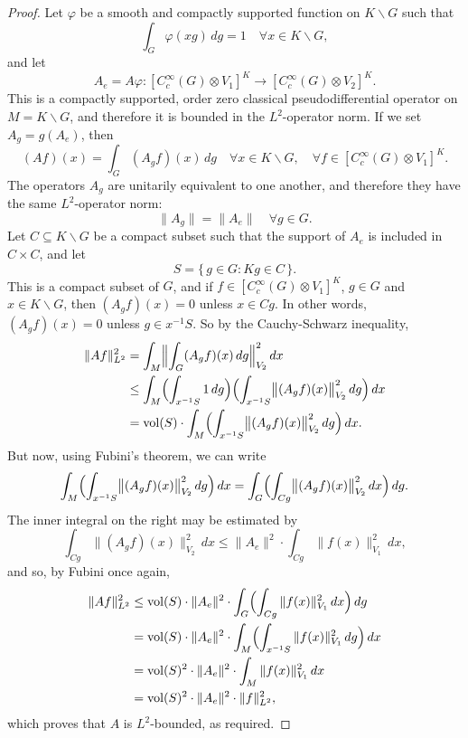 \documentclass[10pt,a4paper]{amsart}
\begin{document}
\begin{proof} 
Let $\varphi$ be a smooth and compactly supported function on $K \backslash G$ such that 
\[
\int_G  \varphi (xg) \, dg = 1 \quad \forall x\in K\backslash G,
\]
and let 
\[
A_e {=}  A\varphi  \colon [C_c^\infty ( G)\otimes V_1]^K \longrightarrow  [C_c^\infty ( G)\otimes V_2]^K .
\]
This is a compactly supported,  order zero classical pseudodifferential operator on $M{=}K\backslash G$, and therefore it is bounded in the $L^2$-operator norm. If we set $A_g = g(A_e)$, then 
\[
(A f)(x) = \int_G (A_g f)(x) \, dg \quad \forall x \in K \backslash G,\quad \forall f\in [C_c^\infty ( G)\otimes V_1]^K  .
\]
The operators $A_g$  are unitarily equivalent to one another, and therefore they have the same $L^2$-operator norm:
\[
\| A_g \| = \| A_e\| \quad  \forall g\in G.
\]
Let  $C\subseteq K \backslash G$ be a compact subset such that the  support of $A_e$ is included in 
$C{\times } C$, and let 
\[
S = \{ \, g\in G : Kg \in C\, \} .
\]
This is a compact subset of $G$, and if  $f\in[C_c^\infty ( G)\otimes V_1]^K $, $g\in G$ and $x\in K \backslash G$, then $(A_gf)(x) = 0$ unless $x\in Cg$. In other words, $(A_gf)(x) = 0$ unless $g\in x^{-1}S$. 
So by the Cauchy-Schwarz inequality,
\[
\begin{aligned}
\| A f\|_{L^2}^2 
    & = \int _M \Bigl \| \int_G (A_gf)(x)\, dg \Bigr\|_{V_2}^2 \, dx \\
    & \le \int _M \Bigl ( \int_{x^{-1} S} 1 \, dg\Bigr ) \Bigl (   \int_{x^{-1}S} \bigl \|(A_gf)(x)\bigr \|_{V_2} ^2 \, dg\Bigr )   \, dx \\
    & = \operatorname{vol}(S)\cdot   \int _M \Bigl (\int_{x^{-1}S} \bigl \|(A_gf)(x)\bigr \|_{V_2} ^2 \, dg \Bigr )   \, dx  .
\end{aligned}
\]
But now, using Fubini's theorem, we can write 
\[
\int _M \Bigl (\int_{x^{-1}S} \bigl \|(A_gf)(x)\bigr \|_{V_2} ^2 \, dg \Bigr )   \, dx \\
     = \int _G \Bigl (\int_{Cg}  \bigl \|(A_gf)(x)\bigr \|_{V_2} ^2 \, dx  \Bigr ) \, dg .
\]
The inner integral on the right may be estimated by
\[
\int_{Cg}  \bigl \|(A_gf)(x)\bigr \|_{V_2} ^2 \, dx \le \| A_e\|^2\cdot \int_{Cg}  \bigl \|f(x)\bigr \|_{V_1} ^2 \, dx ,
\]
and so,  by Fubini  once again,
\[
\begin{aligned}
\| A f\|_{L^2}^2  
    & \le  \operatorname{vol}(S)\cdot  \| A_e\|^2 \cdot 
    \int _G \Bigl (\int_{Cg}   \|f(x)  \|_{V_1} ^2 \, dx  \Bigr ) \, dg \\
    & = \operatorname{vol}(S)\cdot \| A_e\|^2  \cdot 
    \int _M \Bigl (\int_{x^{-1}S}   \|f(x)  \|_{V_1} ^2 \, dg \Bigr )   \, dx \\
    & = \operatorname{vol}(S)^2\cdot \| A_e\|^2  \cdot 
    \int _M    \|f(x)  \|_{V_1} ^2     \, dx
    \\
    & = \operatorname{vol}(S)^2 \cdot \| A_e\|^2 \cdot  \| f\|_{L^2}^2,
\end{aligned}
\]
which proves that $A$ is $L^2$-bounded, as required.
\end{proof} 
\end{document}
